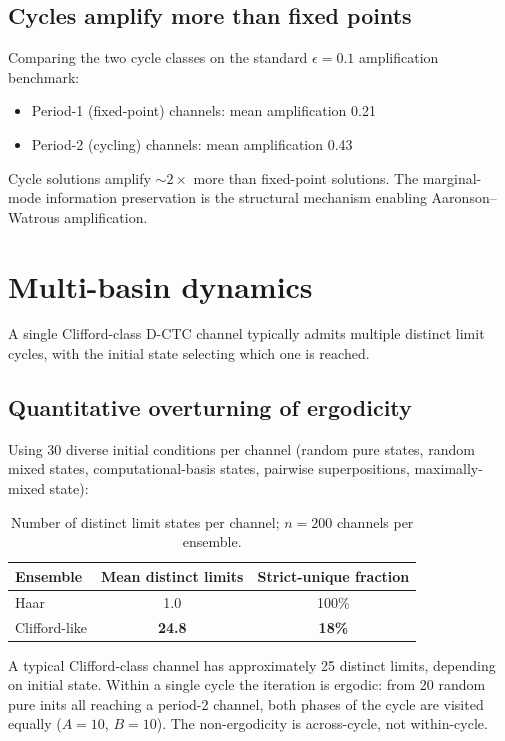 \documentclass[11pt,a4paper]{article}
\begin{document}
\subsection{Cycles amplify more than fixed points}

Comparing the two cycle classes on the standard
$\epsilon = 0.1$ amplification benchmark:
\begin{itemize}
\item Period-1 (fixed-point) channels: mean amplification 0.21
\item Period-2 (cycling) channels: mean amplification 0.43
\end{itemize}

Cycle solutions amplify $\sim 2\times$ more than fixed-point
solutions. The marginal-mode information preservation is the
structural mechanism enabling Aaronson--Watrous amplification.

\section{Multi-basin dynamics}

A single Clifford-class D-CTC channel typically admits multiple
distinct limit cycles, with the initial state selecting which one is
reached.

\subsection{Quantitative overturning of ergodicity}

Using 30 diverse initial conditions per channel (random pure
states, random mixed states, computational-basis states, pairwise
superpositions, maximally-mixed state):

\begin{table}[h]
\centering
\caption{Number of distinct limit states per channel; $n = 200$
channels per ensemble.}
\label{tab:multi-basin}
\begin{tabular}{lcc}
\toprule
Ensemble & Mean distinct limits & Strict-unique fraction \\
\midrule
Haar & 1.0 & 100\% \\
Clifford-like & \textbf{24.8} & \textbf{18\%} \\
\bottomrule
\end{tabular}
\end{table}

A typical Clifford-class channel has approximately 25 distinct
limits, depending on initial state. Within a single cycle the
iteration is ergodic: from 20 random pure inits all reaching a
period-2 channel, both phases of the cycle are visited equally
($A = 10$, $B = 10$). The non-ergodicity is across-cycle, not
within-cycle.
\end{document}

